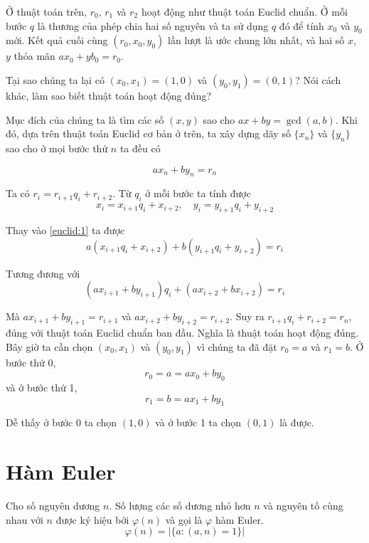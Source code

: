 Ở thuật toán trên, $r_0$, $r_1$ và $r_2$ hoạt động như thuật toán Euclid chuẩn. Ở mỗi bước $q$ là thương của phép chia hai số nguyên và ta sử dụng $q$ đó để tính $x_0$ và $y_0$ mới. Kết quả cuối cùng $(r_0, x_0, y_0)$ lần lượt là ước chung lớn nhất, và hai số $x$, $y$ thỏa mãn $a x_0 + y b_0 = r_0$.

Tại sao chúng ta lại có $(x_0, x_1) = (1, 0)$ và $(y_0, y_1) = (0, 1)$? Nói cách khác, làm sao biết thuật toán  hoạt động đúng?

Mục đích của chúng ta là tìm các số $(x, y)$ sao cho $ax + by = \gcd(a, b)$. Khi đó, dựa trên thuật toán Euclid cơ bản ở trên, ta xây dựng dãy số $\{x_n\}$ và $\{y_n\}$ sao cho ở mọi bước thứ $n$ ta đều có

\begin{equation}\label{euclid:1}
    a x_n + b y_n = r_n
\end{equation}

Ta có $r_i = r_{i+1} q_i + r_{i+2}$. Từ $q_i$ ở mỗi bước ta tính được
\begin{equation*}
    x_i = x_{i+1} q_i + x_{i+2}, \quad y_i = y_{i+1} q_i + y_{i+2}
\end{equation*}

Thay vào \ref{euclid:1} ta được
\begin{equation}
    a (x_{i+1} q_i + x_{i+2}) + b (y_{i+1} q_i + y_{i+2}) = r_i
\end{equation}

Tương đương với \[(a x_{i+1} + b y_{i+1}) q_i + (a x_{i+2} + b x_{i+2}) = r_i\]

Mà $a x_{i+1} + b y_{i+1} = r_{i+1}$ và $a x_{i+2} + b y_{i+2} = r_{i+2}$. Suy ra $r_{i+1} q_i + r_{i+2} = r_n$, đúng với thuật toán Euclid chuẩn ban đầu. Nghĩa là thuật toán hoạt động đúng. Bây giờ ta cần chọn $(x_0, x_1)$ và $(y_0, y_1)$ vì chúng ta đã đặt $r_0 = a$ và $r_1 = b$. Ở bước thứ 0, \[r_0 = a = a x_0 + b y_0\] và ở bước thứ 1,
\[r_1 = b = a x_1 + b y_1\]

Dễ thấy ở bước 0 ta chọn $(1, 0)$ và ở bước 1 ta chọn $(0, 1)$ là được.

\section{Hàm Euler}

\begin{definition}
    Cho số nguyên dương $n$. Số lượng các số dương nhỏ hơn $n$ và nguyên tố cùng nhau với $n$ được ký hiệu bởi $\varphi(n)$ và gọi là $\varphi$ hàm Euler. \[ \varphi(n) = \lvert \{ a : (a, n) = 1\} \rvert \]
\end{definition}   

